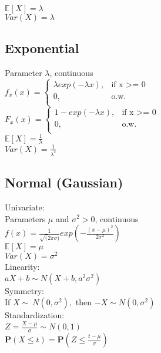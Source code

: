 $\mathbb{E}[X]=\lambda$\\
$Var(X)=\lambda$\\

\subsection*{Exponential}
Parameter $\lambda$, continuous\\
$ f_x(x)=
	\begin{cases}
		 \lambda exp(-\lambda x),&\text{if x >= 0}\\
		0,&\text{o.w.}\\
	\end{cases}
$\\
$ F_x(x)=
	\begin{cases}
		 1-exp(-\lambda x),&\text{if x >= 0}\\
		0,&\text{o.w.}\\
	\end{cases}
$\\

$\mathbb{E}[X]=\frac{1}{\lambda}$\\
$Var(X)=\frac{1}{\lambda^2}$\\

\subsection*{Normal (Gaussian)}
Univariate:\\
Parameters $\mu$ and $\sigma^2 >0$, continuous\\
$f(x)= \frac{1}{\sqrt(2 \pi \sigma)} exp(-\frac{(x-\mu)^2}{2\sigma^2})$ \\
$\mathbb{E}[X]=\mu$ \\
$Var(X)=\sigma^2$\\

Linearity:\\

$aX+b \sim N(X+b,a^2\sigma^2)$\\

Symmetry:\\

If $X \sim\ N(0,\sigma^2),$ then $-X \sim N(0,\sigma^2)$\\

Standardization:\\

$Z= \frac{X-\mu}{\sigma} \sim N(0,1)$\\

$\mathbf{P}\left(X\leq t\right) = \displaystyle \mathbf{P}\left(Z\leq \frac{t-\mu}{\sigma}\right)$

